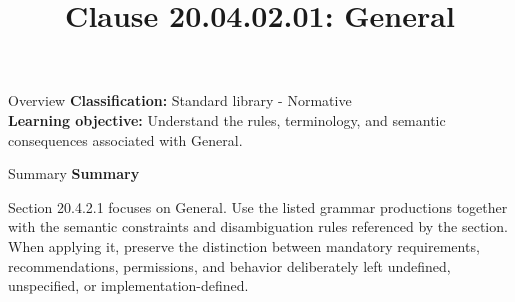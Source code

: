 \documentclass[10pt,letterpaper]{article}
\title{Clause 20.04.02.01: General}
\author{}
\date{}
\begin{document}
\maketitle
\begin{CornellOverviewBox}{Overview}
\textbf{Classification:} Standard library - Normative\\[2pt]
\textbf{Learning objective:} Understand the rules, terminology, and semantic consequences associated with General.
\end{CornellOverviewBox}\begin{CornellSummaryBox}{Summary}
{\sffamily\bfseries\color{Accent} Summary}\par\vspace{3pt}Section 20.4.2.1 focuses on General. Use the listed grammar productions together with the semantic constraints and disambiguation rules referenced by the section. When applying it, preserve the distinction between mandatory requirements, recommendations, permissions, and behavior deliberately left undefined, unspecified, or implementation-defined.
\end{CornellSummaryBox}
\end{document}
